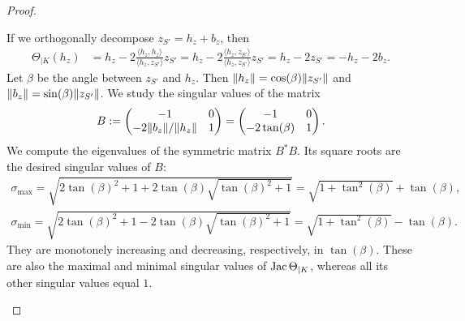 \documentclass[10pt,letterpaper]{article}
\begin{document}
\begin{proof}
\begin{itemize}
        If we orthogonally decompose $z_{S'} = h_{z} + b_{z}$, then 
        \begin{align*}
            \Theta_{|K}( h_{z} ) 
            &= 
            h_{z}
            - 
            2 \frac{\langle h_{z}, h_{z} \rangle}{\langle h_{z}, z_{S'} \rangle} z_{S'}
            = 
            h_{z}
            - 
            2 \frac{\langle h_{z}, z_{S'} \rangle}{\langle h_{z}, z_{S'} \rangle} z_{S'}
            = 
            h_{z}
            - 
            2 z_{S'}
            = 
            - h_{z}
            - 
            2 b_{z}
            .
        \end{align*}
        Let $\beta$ be the angle between $z_{S'}$ and $h_{z}$. 
        Then $\|  h_{z}  \| = \cos(\beta) \|  z_{S'}  \|$ and $\|  b_{z}  \| = \sin(\beta) \|  z_{S'}  \|$. 
        We study the singular values of the matrix 
        \begin{align*}
            B 
            := 
            \begin{pmatrix}
            -1                 & 0
            \\ 
            -2 \|  b_{z}  \|/\|  h_{z}  \| & 1
            \end{pmatrix}
            =
            \begin{pmatrix}
            -1             & 0
            \\ 
            -2 \tan(\beta) & 1
            \end{pmatrix}
            .
        \end{align*}
        We compute the eigenvalues of the symmetric matrix $B^{\ast} B$. 
        Its square roots are the desired singular values of $B$:
        \begin{align*}
            \sigma_{\max} = \sqrt{ 2\tan(\beta)^2 + 1 + 2 \tan(\beta) \sqrt{ \tan(\beta)^2 + 1 } } = \sqrt{ 1 + \tan^{2}(\beta) } + \tan(\beta)
            ,
            \\
            \sigma_{\min} = \sqrt{ 2\tan(\beta)^2 + 1 - 2 \tan(\beta) \sqrt{ \tan(\beta)^2 + 1 } } = \sqrt{ 1 + \tan^{2}(\beta) } - \tan(\beta)
            .
        \end{align*}
        They are monotonely increasing and decreasing, respectively, in $\tan(\beta)$. 
        These are also the maximal and minimal singular values of $\operatorname{{\rm Jac}}\Theta_{|K}$,
        whereas all its other singular values equal $1$. 
        

\end{itemize}
\end{proof}
\end{document}
